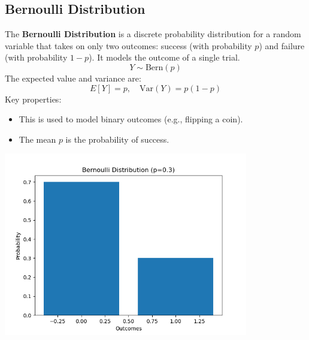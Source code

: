 \documentclass{article}
\begin{document}
\subsection{Bernoulli Distribution}
The \textbf{Bernoulli Distribution} is a discrete probability distribution for a random variable that takes on only two outcomes: success (with probability \(p\)) and failure (with probability \(1 - p\)). It models the outcome of a single trial.
\[
Y \sim \text{Bern}(p)
\]
The expected value and variance are:
\[
E[Y] = p, \quad \text{Var}(Y) = p(1 - p)
\]
Key properties:
\begin{itemize}
    \item This is used to model binary outcomes (e.g., flipping a coin).
    \item The mean \(p\) is the probability of success.
\end{itemize}
\begin{center}
    \includegraphics[width=0.8\textwidth]{./graphs/probDist/bernoulli_distribution.png}
\end{center}

\newpage
\end{document}
